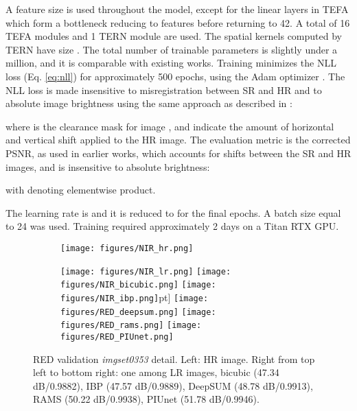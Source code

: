 \documentclass[journal]{IEEEtran}
\begin{document}
A feature size  is used throughout the model, except for the linear layers in TEFA which form a bottleneck reducing to  features before returning to 42. A total of 16 TEFA modules and 1 TERN module are used. The spatial kernels computed by TERN have size . The total number of trainable parameters is slightly under a million, and it is comparable with existing works. Training minimizes the NLL loss (Eq. \eqref{eq:nll}) for approximately 500 epochs, using the Adam optimizer \cite{kingma2014adam}. The NLL loss is made insensitive to misregistration between SR and HR and to absolute image brightness using the same approach as described in \cite{molini2019deepsum}:


where  is the clearance mask for image , and  indicate the amount of horizontal and vertical shift applied to the HR image.
The evaluation metric is the corrected PSNR, as used in earlier works, which accounts for shifts between the SR and HR images, and is insensitive to absolute brightness:


with  denoting elementwise product.

The learning rate is  and it is reduced to  for the final epochs. A batch size equal to 24 was used. Training required approximately 2 days on a Titan RTX GPU.

\begin{figure*}[ht]
    \centering
    \begin{subfigure}[b]{0.39\textwidth}
    \texttt{[image: figures/NIR\_hr.png]}
    \end{subfigure}
    \begin{subfigure}[b]{0.6\textwidth}
    \texttt{[image: figures/NIR\_lr.png]}
    \texttt{[image: figures/NIR\_bicubic.png]}
    \texttt{[image: figures/NIR\_ibp.png]}\2pt]
    \texttt{[image: figures/RED\_deepsum.png]}
    \texttt{[image: figures/RED\_rams.png]}
    \texttt{[image: figures/RED\_PIUnet.png]}
    \end{subfigure}
    \caption{RED validation \textit{imgset0353} detail. Left: HR image. Right from top left to bottom right: one among LR images, bicubic (47.34 dB/0.9882), IBP (47.57 dB/0.9889), DeepSUM (48.78 dB/0.9913), RAMS (50.22 dB/0.9938), PIUnet (51.78 dB/0.9946).}
    \label{fig:red_qualitative}
\end{figure*}
\end{document}
